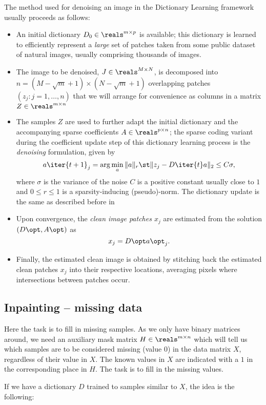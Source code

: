 \documentclass[a4paper]{IEEEtran}
\begin{document}
The method used for denoising an image in the Dictionary Learning framework usually proceeds as follows:
\begin{itemize}
\item An initial dictionary $D_0 \in \reals^{m{\times}p}$ is available; this dictionary is learned to efficiently represent a \emph{large} set of patches taken from some public dataset of natural images, usually comprising thousands of images.
\item The image to be denoised, $J \in \reals^{M{\times}N}$, is decomposed into $n=(M-\sqrt{m}+1){\times}(N-\sqrt{m}+1)$ overlapping patches $(z_j : j = 1,\ldots,n)$ that we will arrange for convenience as columns in a matrix $Z \in \reals^{m{\times}n}$
\item The samples $Z$ are used to further adapt the initial dictionary and the accompanying sparse coefficients $A \in \reals^{p{\times}n}$; the sparse coding variant during the coefficient update step of this dictionary learning process is the \emph{denoising} formulation, given by
\[
a\iter{t+1}_j = \arg\min_a \|a\|_r \st \|z_j - D\iter{t}a \|_2 \leq C\sigma, 
\]
where $\sigma$ is the variance of the noise $C$ is a positive constant usually close to $1$ and $0 \leq r \leq 1$ is a sparsity-inducing (pseudo)-norm. The dictionary update is the same as described before in 
\item Upon convergence, the \emph{clean image patches $x_j$} are estimated from the solution $(D\opt,A\opt)$ as $$x_j = D\opt a\opt_j.$$
\item Finally, the estimated clean image is obtained by stitching back the estimated clean patches $x_j$ into their respective locations, averaging pixels where intersections between patches occur.
\end{itemize}

\subsection{Inpainting -- missing data}

Here the task is to fill in missing samples. As we only have binary matrices around, we need an auxiliary mask matrix $H \in \reals^{m{\times}n}$ which will tell us which samples are to be considered missing (value $0$) in the data matrix $X$, regardless of their value in $X$. The known values in $X$ are indicated with a $1$ in the corresponding place in $H$. The task is to fill in the missing values.

If we have a dictionary $D$ trained to samples similar to $X$, the idea is the following:
\end{document}
